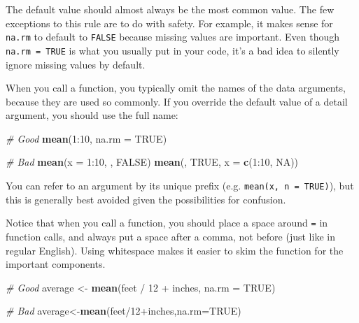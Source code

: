 \documentclass[]{book}
\newenvironment{Shaded}{\begin{snugshade}}{\end{snugshade}}
\newcommand{\KeywordTok}[1]{\textcolor[rgb]{0.13,0.29,0.53}{\textbf{{#1}}}}
\newcommand{\DataTypeTok}[1]{\textcolor[rgb]{0.13,0.29,0.53}{{#1}}}
\newcommand{\DecValTok}[1]{\textcolor[rgb]{0.00,0.00,0.81}{{#1}}}
\newcommand{\StringTok}[1]{\textcolor[rgb]{0.31,0.60,0.02}{{#1}}}
\newcommand{\CommentTok}[1]{\textcolor[rgb]{0.56,0.35,0.01}{\textit{{#1}}}}
\newcommand{\OtherTok}[1]{\textcolor[rgb]{0.56,0.35,0.01}{{#1}}}
\newcommand{\NormalTok}[1]{{#1}}
\begin{document}
The default value should almost always be the most common value. The few
exceptions to this rule are to do with safety. For example, it makes
sense for \texttt{na.rm} to default to \texttt{FALSE} because missing
values are important. Even though \texttt{na.rm\ =\ TRUE} is what you
usually put in your code, it's a bad idea to silently ignore missing
values by default.

When you call a function, you typically omit the names of the data
arguments, because they are used so commonly. If you override the
default value of a detail argument, you should use the full name:

\begin{Shaded}
\begin{Highlighting}[]
\CommentTok{# Good}
\KeywordTok{mean}\NormalTok{(}\DecValTok{1}\NormalTok{:}\DecValTok{10}\NormalTok{, }\DataTypeTok{na.rm =} \OtherTok{TRUE}\NormalTok{)}

\CommentTok{# Bad}
\KeywordTok{mean}\NormalTok{(}\DataTypeTok{x =} \DecValTok{1}\NormalTok{:}\DecValTok{10}\NormalTok{, , }\OtherTok{FALSE}\NormalTok{)}
\KeywordTok{mean}\NormalTok{(, }\OtherTok{TRUE}\NormalTok{, }\DataTypeTok{x =} \KeywordTok{c}\NormalTok{(}\DecValTok{1}\NormalTok{:}\DecValTok{10}\NormalTok{, }\OtherTok{NA}\NormalTok{))}
\end{Highlighting}
\end{Shaded}

You can refer to an argument by its unique prefix (e.g.
\texttt{mean(x,\ n\ =\ TRUE)}), but this is generally best avoided given
the possibilities for confusion.

Notice that when you call a function, you should place a space around
\texttt{=} in function calls, and always put a space after a comma, not
before (just like in regular English). Using whitespace makes it easier
to skim the function for the important components.

\begin{Shaded}
\begin{Highlighting}[]
\CommentTok{# Good}
\NormalTok{average <-}\StringTok{ }\KeywordTok{mean}\NormalTok{(feet /}\StringTok{ }\DecValTok{12} \NormalTok{+}\StringTok{ }\NormalTok{inches, }\DataTypeTok{na.rm =} \OtherTok{TRUE}\NormalTok{)}

\CommentTok{# Bad}
\NormalTok{average<-}\KeywordTok{mean}\NormalTok{(feet/}\DecValTok{12}\NormalTok{+inches,}\DataTypeTok{na.rm=}\OtherTok{TRUE}\NormalTok{)}
\end{Highlighting}
\end{Shaded}
\end{document}
